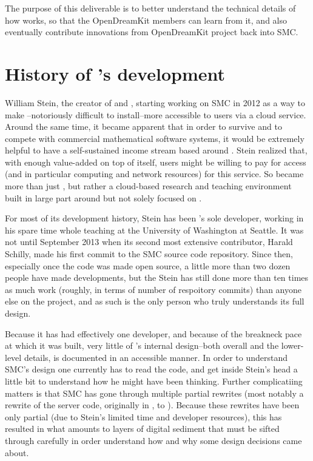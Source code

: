 \documentclass{deliverablereport}
\begin{document}
The purpose of this deliverable is to better understand the technical details
of how \SMC works, so that the OpenDreamKit members can learn from it, and also
eventually contribute innovations from OpenDreamKit project back into SMC.

\section{History of \SMC's development}

William Stein, the creator of \Sage and \SMC, starting working on SMC in 2012
as a way to make \Sage--notoriously difficult to install--more accessible to
users via a cloud service.  Around the same time, it became apparent that in
order to survive and to compete with commercial mathematical software systems,
it would be extremely helpful to have a self-sustained income stream based
around \Sage.  Stein realized that, with enough value-added on top of \Sage
itself, users might be willing to pay for access (and in particular computing
and network resources) for this service.  So \SMC became more than just \Sage,
but  rather a cloud-based research and teaching environment built in large part
around but not solely focused on \Sage.

For most of its development history, Stein has been \SMC's sole developer,
working in his spare time whole teaching at the University of Washington at
Seattle.  It was not until September 2013 when its second most extensive
contributor, Harald Schilly, made his first commit to the SMC source code
repository.  Since then, especially once the code was made open source, a
little more than two dozen people have made developments, but the Stein has
still done more than ten times as much work (roughly, in terms of number of
respoitory commits) than anyone else on the project, and as such is the only
person who truly understands its full design.

Because it has had effectively one developer, and because of the breakneck pace
at which it was built, very little of \SMC's internal design--both overall and
the lower-level details, is documented in an accessible manner.  In order to
understand SMC's design one currently has to read the code, and get inside
Stein's head a little bit to understand how he might have been thinking.
Further complicatiing matters is that SMC has gone through multiple partial
rewrites (most notably a rewrite of the server code, originally in \Python, to
\JavaScript).  Because these rewrites have been only partial (due to Stein's
limited time and developer resources), this has resulted in what amounts to
layers of digital sediment that must be sifted through carefully in order
understand how and why some design decisions came about.
\end{document}
